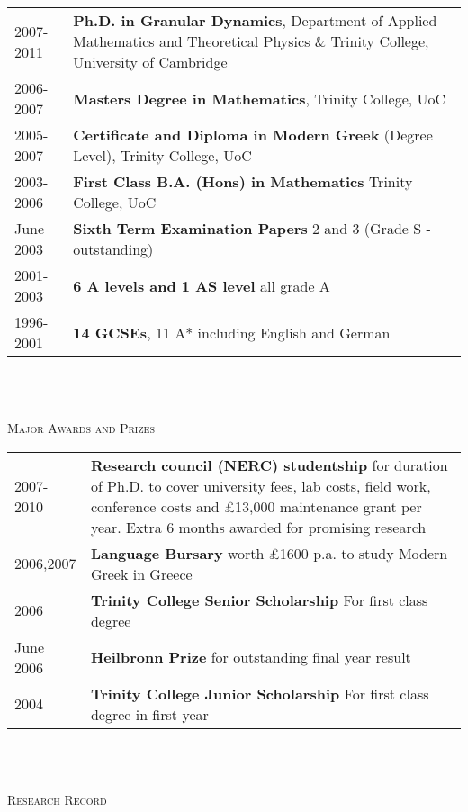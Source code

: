 \documentclass[a4paper,10pt]{article}
\newcommand{\lineunder}{\vspace*{0.2cm} \\ \hspace*{-20pt} \hrulefill \\ \vspace{-0.9cm}}
\newcommand{\header}[1]{{\hspace*{-17pt}\vspace*{6pt} \large{\textsc{#1}}}}
\begin{document}
\begin{tabular}{p{0.8in}p{5.3in}}
2007-2011 & \textbf{Ph.D. in Granular Dynamics}, Department of Applied Mathematics and Theoretical Physics \& Trinity College, University of Cambridge \\
2006-2007 & \textbf{Masters Degree in Mathematics}, Trinity College, UoC \\ 
2005-2007 & \textbf{Certificate and Diploma in Modern Greek} (Degree Level), Trinity College, UoC \\
2003-2006 & \textbf{First Class B.A. (Hons) in Mathematics} Trinity College, UoC \\
June 2003 & \textbf{Sixth Term Examination Papers} 2 and 3 (Grade S - outstanding)  \\
2001-2003 & \textbf{6 A levels and 1 AS level} all grade A \\
1996-2001 & \textbf{14 GCSEs}, 11 A* including English and German \\
\end{tabular}
\newline
\lineunder

\header{Major Awards and Prizes}

\begin{tabular}{p{0.8in}p{5.3in}}
2007-2010 & \textbf{Research council (NERC) studentship} for duration of Ph.D. to cover university fees, lab costs, field work, conference costs and \pounds 13,000 maintenance grant per year. Extra 6 months awarded for promising research\\ 
2006,2007 & \textbf{Language Bursary} worth \pounds 1600 p.a. to study Modern Greek in Greece\\ 
2006 & \textbf{Trinity College Senior Scholarship} For first class degree\\
June 2006 & \textbf{Heilbronn Prize} for outstanding final year result\\
2004 & \textbf{Trinity College Junior Scholarship} For first class degree in first year\\

\end{tabular}
\newline
\lineunder

\header{Research Record}
\end{document}
